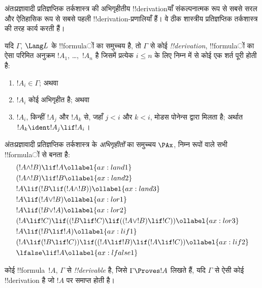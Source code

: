 \documentclass[../../../include/open-logic-section]{subfiles}
\begin{document}


अंतःप्रज्ञावादी प्रतिज्ञप्तिक तर्कशास्त्र की अभिगृहीतीय !!{derivation}याँ
संकल्पनात्मक रूप से सबसे सरल और ऐतिहासिक रूप से सबसे पहली
!!{derivation}-प्रणालियाँ हैं। वे ठीक शास्त्रीय प्रतिज्ञप्तिक तर्कशास्त्र की
तरह कार्य करती हैं।

\begin{defn}[!!{derivability}]
यदि $\Gamma$, $\Lang L$ के !!{formula}ों का समुच्चय है, तो $\Gamma$ से कोई
\emph{!!{derivation}}, !!{formula}ों का ऐसा परिमित अनुक्रम $!A_1$,
\dots,~$!A_n$ है जिसमें प्रत्येक $i \le n$ के लिए निम्न में से कोई एक
शर्त पूरी होती है:
\begin{enumerate}
\item $!A_i \in \Gamma$; अथवा
\item $!A_i$ कोई अभिगृहीत है; अथवा
\item $!A_i$, किन्हीं $!A_j$ और $!A_k$ से, जहाँ $j < i$ और $k < i$,
  मोडस पोनेन्स द्वारा मिलता है; अर्थात $!A_k \ident !A_j \lif !A_i$।
\end{enumerate}
\end{defn}

\begin{defn}[अभिगृहीत]
अंतःप्रज्ञावादी प्रतिज्ञप्तिक तर्कशास्त्र के \emph{अभिगृहीतों} का समुच्चय
$\PAx$, निम्न रूपों वाले सभी !!{formula}ों से बनता है:
\begin{align}
  & (!A \land !B) \lif !A \ollabel{ax:land1}\\
  & (!A \land !B) \lif !B \ollabel{ax:land2}\\
  & {}!A \lif (!B \lif (!A \land !B)) \ollabel{ax:land3}\\
  & {}!A \lif (!A \lor !B) \ollabel{ax:lor1}\\
  & {}!A \lif (!B \lor !A) \ollabel{ax:lor2}\\
  & (!A \lif !C) \lif ((!B \lif !C) \lif ((!A \lor !B) \lif !C)) \ollabel{ax:lor3}\\
  & {}!A \lif (!B \lif !A) \ollabel{ax:lif1}\\
  & (!A \lif (!B \lif !C)) \lif ((!A \lif !B) \lif (!A \lif !C)) \ollabel{ax:lif2}\\
  & \lfalse \lif !A \ollabel{ax:lfalse1}
\end{align}
\end{defn}

\begin{defn}[!!{derivability}]
कोई !!{formula}~$!A$, $\Gamma$ से \emph{!!{derivable}} है, जिसे
$\Gamma \Proves !A$ लिखते हैं, यदि $\Gamma$ से ऐसी कोई !!{derivation} है
जो $!A$ पर समाप्त होती है।
\end{defn}
\end{document}
